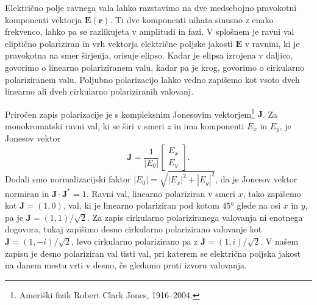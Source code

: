 Električno polje ravnega vala lahko razstavimo na dve medsebojno 
pravokotni komponenti vektorja $\mathbf{E}(\mathbf{r})$. Ti dve komponenti
nihata sinusno z enako frekvenco, lahko pa se razlikujeta v amplitudi in fazi. 
V splošnem je ravni val eliptično polariziran in
vrh vektorja električne poljske jakosti $\mathbf E$ v ravnini, ki je pravokotna na smer
širjenja, orisuje elipso. Kadar je elipsa izrojena v daljico,
govorimo o linearno polariziranem valu,
kadar pa je krog, govorimo o cirkularno polariziranem valu. 
Poljubno polarizacijo lahko vedno zapišemo kot vsoto dveh linearno ali dveh cirkularno polariziranih
valovanj. 

Priročen zapis polarizacije je s kompleksnim Jonesovim 
vektorjem\footnote{Ameriški fizik Robert Clark Jones, 1916--2004.}
$\mathbf{J}$. Za monokromatski ravni val, ki se širi v smeri $z$ in ima komponenti $E_x$ in $E_y$, je
Jonesov vektor
\begin{equation}
\mathbf{J}=\frac{1}{|E_{0}|}\left[\begin{array}{c}
E_{x}\\
E_{y}
\end{array}\right].
\end{equation}
Dodali smo normalizacijski faktor $|E_{0}|=\sqrt{|E_{x}|^{2}+|E_{y}|^{2}}$,
da je Jonesov vektor normiran in $\mathbf{J}\cdot\mathbf{J}^{*}=1$.
Ravni val, linearno polariziran v smeri $x$, tako zapišemo kot $\mathbf{J}=\left(1,0\right)$,
val, ki je linearno polariziran pod kotom $\ang{45}$ glede na osi
$x$ in $y$, pa je $\mathbf{J}=\left(1,1\right)/\sqrt{2}$.
Za zapis cirkularno polariziranega valovanja ni enotnega dogovora, tukaj zapišimo
desno cirkularno polarizirano valovanje kot 
$\mathbf{J}=\left(1,-i\right)/\sqrt{2}$,
levo cirkularno polarizirano pa z $\mathbf{J}=\left(1,i\right)/\sqrt{2}$.
V našem zapisu je desno polariziran val tisti val, pri katerem se električna
poljska jakost na danem mestu vrti v desno, če gledamo proti izvoru valovanja. 

